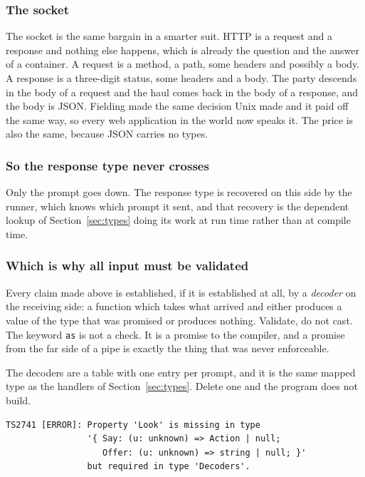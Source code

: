 \documentclass[11pt,a4paper]{article}
\begin{document}
\subsubsection*{The socket}

The socket is the same bargain in a smarter suit. HTTP is a request and a response and nothing else
happens, which is already the question and the answer of a container. A request is a method, a
path, some headers and possibly a body. A response is a three-digit status, some headers and a body.
The party descends in the body of a request and the haul comes back in the body of a response, and
the body is JSON. Fielding made the same decision Unix made and it paid off the same way, so every
web application in the world now speaks it. The price is also the same, because JSON carries no
types.

\subsubsection*{So the response type never crosses}

Only the prompt goes down. The response type is recovered on this side by the runner, which knows
which prompt it sent, and that recovery is the dependent lookup of Section~\ref{sec:types} doing
its work at run time rather than at compile time.

\subsubsection*{Which is why all input must be validated}

Every claim made above is established, if it is established at all, by a \emph{decoder} on the
receiving side: a function which takes what arrived and either produces a value of the type that
was promised or produces nothing. Validate, do not cast. The keyword \texttt{as} is not a check. It
is a promise to the compiler, and a promise from the far side of a pipe is exactly the thing that
was never enforceable.

The decoders are a table with one entry per prompt, and it is the same mapped type as the handlers
of Section~\ref{sec:types}. Delete one and the program does not build.

\begin{lstlisting}[breaklines=false, basicstyle=\ttfamily\footnotesize]
TS2741 [ERROR]: Property 'Look' is missing in type
                '{ Say: (u: unknown) => Action | null;
                   Offer: (u: unknown) => string | null; }'
                but required in type 'Decoders'.
\end{lstlisting}
\end{document}
